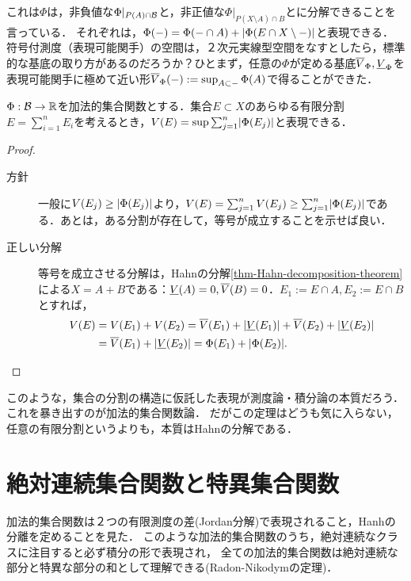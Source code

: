 \documentclass[uplatex, dvipdfmx]{jsreport}
\begin{document}
\begin{remarks}
    これは$\Phi$は，非負値な$\Phi|_{P(A)\cap\mathcal{B}}$と，非正値な$\Phi|_{P(X\setminus A)\cap B}$とに分解できることを言っている．
    それぞれは，$\Phi(-)=\Phi(-\cap A)+\lvert\Phi(E\cap X\setminus-)\rvert$と表現できる．
    符号付測度（表現可能関手）の空間は，２次元実線型空間をなすとしたら，標準的な基底の取り方があるのだろうか？ひとまず，任意の$\Phi$が定める基底$\overline{V}_\Phi,\underline{V}_\Phi$を表現可能関手に極めて近い形$\overline{V}_\Phi(-):=\sup_{A\subset-}\Phi(A)$で得ることができた．
\end{remarks}

\begin{theorem}
    $\Phi:\mathcal{B}\to\mathbb{R}$を加法的集合関数とする．集合$E\subset X$のあらゆる有限分割$E=\sum^n_{i=1}E_i$を考えるとき，$V(E)=\sup\sum^n_{j=1}\lvert\Phi(E_j)\rvert$と表現できる．
\end{theorem}
\begin{proof}\mbox{}
    \begin{description}
        \item[方針] 一般に$V(E_j)\ge\lvert\Phi(E_j)\rvert$より，$V(E)=\sum^n_{j=1}V(E_j)\ge\sum^n_{j=1}\lvert\Phi(E_j)\rvert$である．あとは，ある分割が存在して，等号が成立することを示せば良い．
        \item[正しい分解] 等号を成立させる分解は，Hahnの分解\ref{thm-Hahn-decomposition-theorem}による$X=A+B$である：$\underline{V}(A)=0,\overline{V}(B)=0$．$E_1:=E\cap A,E_2:=E\cap B$とすれば， \begin{align*}
            V(E)&=V(E_1)+V(E_2)=\overline{V}(E_1)+\lvert\underline{V}(E_1)\rvert+\overline{V}(E_2)+\lvert\underline{V}(E_2)\rvert\\
            &=\overline{V}(E_1)+\lvert\underline{V}(E_2)\rvert=\Phi(E_1)+\lvert\Phi(E_2)\rvert.
        \end{align*}
    \end{description}
\end{proof}
\begin{remarks}
    このような，集合の分割の構造に仮託した表現が測度論・積分論の本質だろう．
    これを暴き出すのが加法的集合関数論．
    だがこの定理はどうも気に入らない，任意の有限分割というよりも，本質はHahnの分解である．
\end{remarks}

\section{絶対連続集合関数と特異集合関数}

\begin{tcolorbox}[colframe=ForestGreen, colback=ForestGreen!10!white,breakable,colbacktitle=ForestGreen!40!white,coltitle=black,fonttitle=\bfseries\sffamily,
title=]
    加法的集合関数は２つの有限測度の差(Jordan分解)で表現されること，Hanhの分離を定めることを見た．
    このような加法的集合関数のうち，絶対連続なクラスに注目すると必ず積分の形で表現され，
    全ての加法的集合関数は絶対連続な部分と特異な部分の和として理解できる(Radon-Nikodymの定理)．
\end{tcolorbox}
\end{document}
